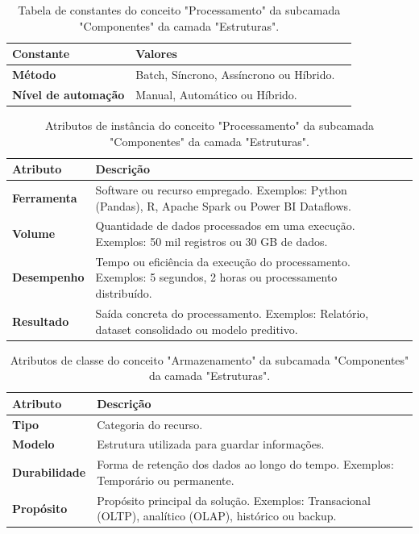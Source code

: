 \begin{apendicesenv}
\begin{table}[H]
\centering
\caption{Tabela de constantes do conceito "Processamento" da subcamada "Componentes" da camada "Estruturas".}
\begin{tabularx}{\textwidth}{|l|X|X|}
\hline
\textbf{Constante} & \textbf{Valores} \\ \hline
\textbf{Método} & Batch, Síncrono, Assíncrono ou Híbrido. \\ \hline
\textbf{Nível de automação} & Manual, Automático ou Híbrido. \\ \hline
\end{tabularx}
\end{table}

\begin{table}[H]
\centering
\caption{Atributos de instância do conceito "Processamento" da subcamada "Componentes" da camada "Estruturas".}
\begin{tabularx}{\textwidth}{|l|X|X|}
\hline
\textbf{Atributo} & \textbf{Descrição} \\ \hline
\textbf{Ferramenta} & Software ou recurso empregado. Exemplos: Python (Pandas), R, Apache Spark ou Power BI Dataflows.\\ \hline
\textbf{Volume} & Quantidade de dados processados em uma execução. Exemplos: 50 mil registros ou 30 GB de dados.\\ \hline
\textbf{Desempenho} & Tempo ou eficiência da execução do processamento. Exemplos: 5 segundos, 2 horas ou processamento distribuído. \\ \hline
\textbf{Resultado} & Saída concreta do processamento. Exemplos: Relatório, dataset consolidado ou modelo preditivo. \\ \hline
\end{tabularx}
\end{table}

\begin{table}[H]
\centering
\caption{Atributos de classe do conceito "Armazenamento" da subcamada "Componentes" da camada "Estruturas".}
\begin{tabularx}{\textwidth}{|l|X|X|}
\hline
\textbf{Atributo} & \textbf{Descrição} \\ \hline
\textbf{Tipo}& Categoria do recurso. \\ \hline
\textbf{Modelo}& Estrutura utilizada para guardar informações.\\ \hline
\textbf{Durabilidade}& Forma de retenção dos dados ao longo do tempo. Exemplos: Temporário ou permanente.\\ \hline
\textbf{Propósito}& Propósito principal da solução. Exemplos: Transacional (OLTP), analítico (OLAP), histórico ou backup. \\ \hline
\end{tabularx}
\end{table}


\end{apendicesenv}

